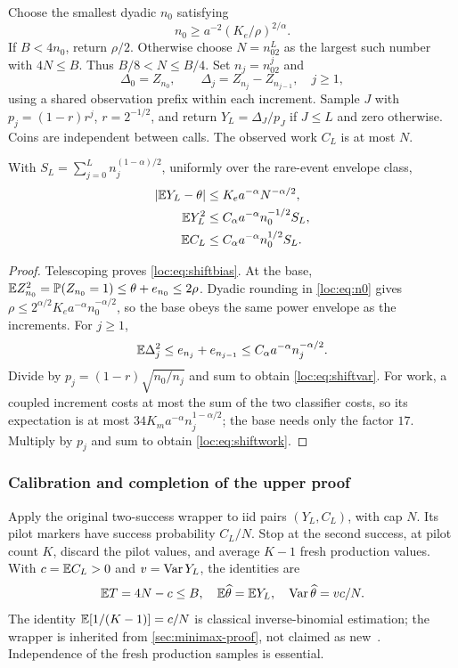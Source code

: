 Choose the smallest dyadic $n_0$ satisfying
\begin{equation}\label{loc:eq:n0}
 n_0\ge a^{-2}(K_e/\rho)^{2/\alpha}.
\end{equation}
If $B<4n_0$, return $\rho/2$. Otherwise choose $N=n_02^L$ as the largest such number with $4N\le B$. Thus $B/8<N\le B/4$. Set $n_j=n_02^j$ and
\[
 \Delta_0=Z_{n_0},\qquad \Delta_j=Z_{n_j}-Z_{n_{j-1}},\quad j\ge1,
\]
using a shared observation prefix within each increment. Sample $J$ with
$p_j=(1-r)r^j$, $r=2^{-1/2}$, and return $Y_L=\Delta_J/p_J$ if $J\le L$ and zero otherwise. Coins are independent between calls. The observed work $C_L$ is at most $N$.

\begin{lemma}\label{loc:lem:shiftbounds}
With $S_L=\sum_{j=0}^L n_j^{(1-\alpha)/2}$, uniformly over the rare-event envelope class,
\begin{align}
 |\mathbb E Y_L-\theta|&\le K_e a^{-\alpha}N^{-\alpha/2},\label{loc:eq:shiftbias}\\
 \mathbb E Y_L^2&\le C_\alpha a^{-\alpha}n_0^{-1/2}S_L,\label{loc:eq:shiftvar}\\
 \mathbb E C_L&\le C_\alpha a^{-\alpha}n_0^{1/2}S_L.\label{loc:eq:shiftwork}
\end{align}
\end{lemma}
\begin{proof}
Telescoping proves \eqref{loc:eq:shiftbias}. At the base,
$\mathbb E Z_{n_0}^2=\mathbb P(Z_{n_0}=1)\le\theta+e_{n_0}\le2\rho$.
Dyadic rounding in \eqref{loc:eq:n0} gives
$\rho\le2^{\alpha/2}K_e a^{-\alpha}n_0^{-\alpha/2}$, so the base obeys the same power envelope as the increments. For $j\ge1$,
\[
 \mathbb E\Delta_j^2\le e_{n_j}+e_{n_{j-1}}\le C_\alpha a^{-\alpha}n_j^{-\alpha/2}.
\]
Divide by $p_j=(1-r)\sqrt{n_0/n_j}$ and sum to obtain \eqref{loc:eq:shiftvar}. For work, a coupled increment costs at most the sum of the two classifier costs, so its expectation is at most $34K_m a^{-\alpha}n_j^{1-\alpha/2}$; the base needs only the factor $17$. Multiply by $p_j$ and sum to obtain \eqref{loc:eq:shiftwork}.
\end{proof}

\subsubsection{Calibration and completion of the upper proof}
Apply the original two-success wrapper to iid pairs $(Y_L,C_L)$, with cap $N$. Its pilot markers have success probability $C_L/N$. Stop at the second success, at pilot count $K$, discard the pilot values, and average $K-1$ fresh production values. With $c=\mathbb E C_L>0$ and $v=\operatorname{Var} Y_L$, the identities are
\begin{equation}\label{loc:eq:calibration}
 \mathbb E T=4N-c\le B,\quad \mathbb E\widehat\theta=\mathbb E Y_L,\quad
 \operatorname{Var}\widehat\theta=vc/N.
\end{equation}
The identity $\mathbb E[1/(K-1)]=c/N$ is classical inverse-binomial estimation; the wrapper is inherited from \cref{sec:minimax-proof}, not claimed as new~\cite{haldane,mendo}. Independence of the fresh production samples is essential.

